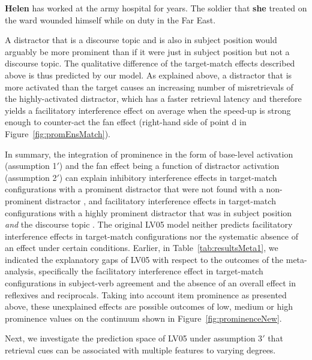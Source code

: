 \documentclass{cambridge7A}\usepackage[]{graphicx}\usepackage[]{color}
\begin{document}
\begin{exe} 
\ex\label{ex:cf13:ex2baseline}
\textbf{Helen} has worked at the army hospital for years. The soldier that \textbf{she} treated on the ward wounded himself while on duty in the Far East.
\end{exe}

A distractor that is a discourse topic and is also in subject position would arguably be more prominent than if it were just in subject position but not a discourse topic. The qualitative difference of the target-match effects described above is thus predicted by our model. As explained above, a distractor that is more activated than the target causes an increasing number of misretrievals of the highly-activated distractor, which has a faster retrieval latency and therefore yields a facilitatory interference effect on average when the speed-up is strong enough to counter-act the fan effect (right-hand side of point d in Figure~\ref{fig:promEnsMatch}).

In summary, the integration of prominence in the form of base-level  activation (assumption 1$'$) and the fan effect being a function of distractor activation (assumption 2$'$) can explain inhibitory interference effects in target-match configurations with a prominent distractor that were not found with a non-prominent distractor \citep{VanDykeMcElree2011,PatilVasishthLewis2016,JaegerEngelmannVasishth2015}, and facilitatory interference effects in target-match configurations with a highly prominent distractor that was in subject position \emph{and} the discourse topic \citep{CunningsFelser2013,Sturt2003}.
The original LV05 model neither predicts facilitatory interference effects in target-match configurations nor the systematic absence of an effect under certain conditions.
Earlier, in Table~\ref{tab:resultsMeta1}, we indicated the explanatory gaps of LV05 with respect to the outcomes of the \cite{JaegerEngelmannVasishth2017} meta-analysis, specifically the facilitatory interference effect in target-match configurations in subject-verb agreement and the absence of an overall effect in reflexives and reciprocals. 
Taking into account item prominence as presented above, these unexplained effects are possible outcomes of low, medium or high prominence values on the continuum shown in Figure~\ref{fig:prominenceNew}.

Next, we investigate the prediction space of LV05 under assumption 3$'$ that retrieval cues can be associated with multiple features to varying degrees.
\end{document}
